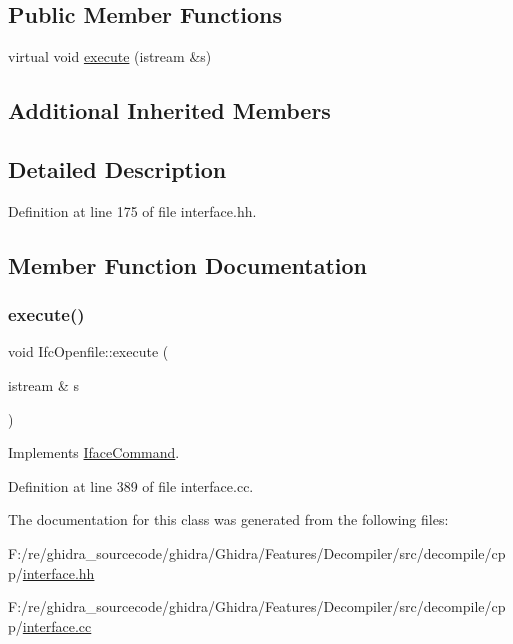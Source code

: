 \subsection*{Public Member Functions}
\begin{DoxyCompactItemize}
\item 
virtual void \mbox{\hyperlink{class_ifc_openfile_a2cb0a3f5fa5d023b4de08a34220a79d3}{execute}} (istream \&s)
\end{DoxyCompactItemize}
\subsection*{Additional Inherited Members}


\subsection{Detailed Description}


Definition at line 175 of file interface.\+hh.



\subsection{Member Function Documentation}
\mbox{\label{class_ifc_openfile_a2cb0a3f5fa5d023b4de08a34220a79d3}} 
\subsubsection{\texorpdfstring{execute()}{execute()}}
{\footnotesize\ttfamily void Ifc\+Openfile\+::execute (\begin{DoxyParamCaption}\item[{istream \&}]{s }\end{DoxyParamCaption})\hspace{0.3cm}{\ttfamily [virtual]}}



Implements \mbox{\hyperlink{class_iface_command_af10e29cee2c8e419de6efe9e680ad201}{Iface\+Command}}.



Definition at line 389 of file interface.\+cc.



The documentation for this class was generated from the following files\+:\begin{DoxyCompactItemize}
\item 
F\+:/re/ghidra\+\_\+sourcecode/ghidra/\+Ghidra/\+Features/\+Decompiler/src/decompile/cpp/\mbox{\hyperlink{interface_8hh}{interface.\+hh}}\item 
F\+:/re/ghidra\+\_\+sourcecode/ghidra/\+Ghidra/\+Features/\+Decompiler/src/decompile/cpp/\mbox{\hyperlink{interface_8cc}{interface.\+cc}}\end{DoxyCompactItemize}
